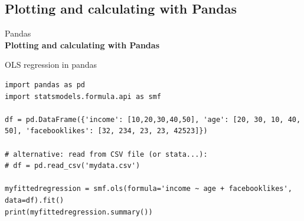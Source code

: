 \documentclass{beamer}
\begin{document}
\subsection{Plotting and calculating with Pandas}
\begin{frame}[plain]
	Pandas\\
	\textbf{Plotting and calculating with Pandas}
\end{frame}



\begin{frame}[fragile]{OLS regression in pandas}
\begin{lstlisting}
import pandas as pd
import statsmodels.formula.api as smf 

df = pd.DataFrame({'income': [10,20,30,40,50], 'age': [20, 30, 10, 40, 50], 'facebooklikes': [32, 234, 23, 23, 42523]})

# alternative: read from CSV file (or stata...):
# df = pd.read_csv('mydata.csv')

myfittedregression = smf.ols(formula='income ~ age + facebooklikes', data=df).fit()
print(myfittedregression.summary())
\end{lstlisting}
	
\end{frame}
\end{document}
